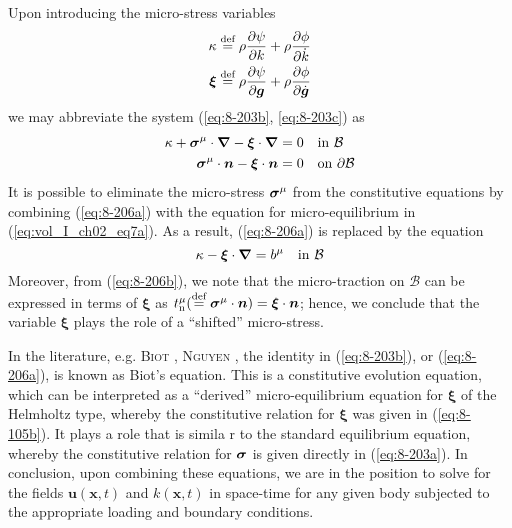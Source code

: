 Upon introducing the micro-stress variables
\begin{subequations}\label{eq:8-105}
    \begin{align}
    \kappa &\stackrel{\text{def}}{=} \rho\frac{\partial \psi}{\partial k} + \rho\frac{\partial \phi}{\partial \dot{k}}
\label{eq:8-105a}\\
    \bm{\xi} &\stackrel{\text{def}}{=} \rho\frac{\partial \psi}{\partial \bm {g}} + \rho\frac{\partial \phi}{\partial \dot{\bm {g}}}
\label{eq:8-105b}
    \end{align}
\end{subequations}
we may abbreviate the system (\ref{eq:8-203b}, \ref{eq:8-203c}) as
\begin{subequations}\label{eq:8-206}
    \begin{align}
    \kappa + \bm{\sigma}^{\mathrm{\mu}}\cdot{\bm\nabla} - \bm{\xi}\cdot{\bm\nabla} &= 0 \quad
    \mbox{in }  \mathcal{B}
\label{eq:8-206a} \\
    \bm{\sigma}^{\mathrm{\mu}}\cdot\bm{n} -  \bm{\xi}\cdot\bm{n} &= 0 \quad
    \mbox{on }  \partial\mathcal{B}
\label{eq:8-206b}
    \end{align}
\end{subequations}
It is possible to eliminate the micro-stress $\bm{\sigma}^{\mathrm{\mu}}$ from the constitutive 
equations by combining (\ref{eq:8-206a}) with the equation for micro-equilibrium
 in (\ref{eq:vol_I_ch02_eq7a}). As a result, (\ref{eq:8-206a}) is replaced by 
 the equation
\begin{equation}
    \kappa - \bm{\xi}\cdot{\bm\nabla} = b^{\mathrm{\mu}} \quad
    \mbox{in }  \mathcal{B}
\label{eq:8-207}
\end{equation}
Moreover, from (\ref{eq:8-206b}), we note that the micro-traction on 
$\mathcal{B}$ can be expressed in terms of $\bm{\xi}$ as 
$t_{\mathrm{n}}^{\mathrm{\mu}}(\stackrel{\text{def}}{=}\bm{\sigma}^{\mathrm{\mu}}\cdot\bm{n}) 
=\bm{\xi}\cdot\bm{n}$; hence, we conclude that the variable $\bm{\xi}$
 plays the role of a ``shifted'' micro-stress.

In the literature, e.g. {\scshape Biot} \cite{Biot1965}, {\scshape Nguyen} 
\cite{Nguyen2000}, the identity in (\ref{eq:8-203b}), or (\ref{eq:8-206a}),
is known as Biot's equation. This is a constitutive evolution equation,
which can be interpreted as a ``derived'' micro-equilibrium equation for
$\bm{\xi}$ of the Helmholtz type, whereby the constitutive relation for 
$\bm{\xi}$ was given in (\ref{eq:8-105b}). It plays a role that is simila
r to the standard equilibrium equation, whereby the constitutive relation
for $\bm{\sigma}$ is given directly in (\ref{eq:8-203a}). In conclusion,
upon combining these equations, we are in the position to solve for 
the fields $\bm{u}(\bm{x},t)$ and $k(\bm{x},t)$ in space-time for any
given body subjected to the appropriate loading and boundary conditions.


